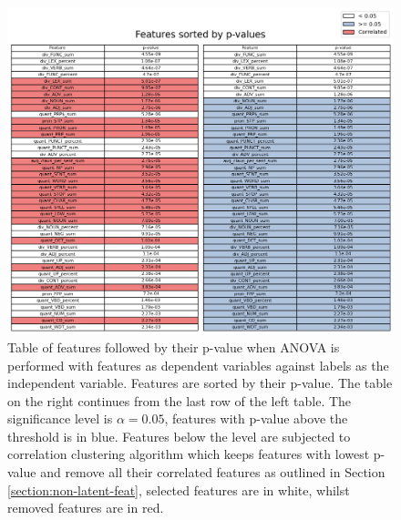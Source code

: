 \documentclass{article}
\begin{document}
\begin{appendices}
\label{appendix:non-latent-anova}
\begin{figure}[H]
  \centering
  \includegraphics[width=\textwidth]{img/non_latent_feat_prune.png}
  \caption{Table of features followed by their p-value when ANOVA is performed with features as dependent variables against labels as the independent variable. Features are sorted by their p-value. The table on the right continues from the last row of the left table. The significance level is $\alpha = 0.05$, features with p-value above the threshold is in blue. Features below the level are subjected to correlation clustering algorithm which keeps features with lowest p-value and remove all their correlated features as outlined in Section \ref{section:non-latent-feat}, selected features are in white, whilst removed features are in red.}
  \label{fig:non-latent-feat-prune}
\end{figure}

\label{apppendix:machine-learning}


\end{appendices}
\end{document}

